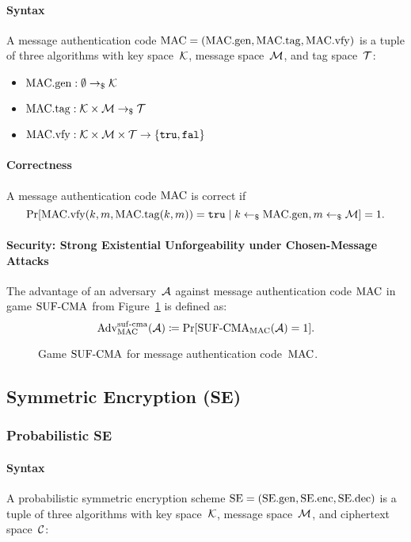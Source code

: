 \documentclass[a4paper,orivec]{llncs}
\begin{document}
\paragraph{Syntax}
A message authentication code $\mathrm{MAC}=(\mathrm{MAC}.\mathrm{gen},\mathrm{MAC}.\mathrm{tag},\mathrm{MAC}.\mathrm{vfy})$ is a tuple of three algorithms with key space~$\mathcal{K}$, message space~$\mathcal{M}$, and tag space~$\mathcal{T}$:

\begin{itemize}
    \item $\mathrm{MAC}.\mathrm{gen}: \emptyset \to_\$ \mathcal{K}$
    \item $\mathrm{MAC}.\mathrm{tag}: \mathcal{K}\times\mathcal{M} \to_\$ \mathcal{T}$
    \item $\mathrm{MAC}.\mathrm{vfy}: \mathcal{K}\times\mathcal{M}\times\mathcal{T} \to \{\mathtt{tru},\mathtt{fal}\}$
\end{itemize}

\paragraph{Correctness}
A message authentication code $\mathrm{MAC}$ is correct if
\[
\Pr[\mathrm{MAC}.\mathrm{vfy}(k,m,\mathrm{MAC}.\mathrm{tag}(k,m))=\mathtt{tru}\mid k\gets_\$\mathrm{MAC}.\mathrm{gen},m\gets_\$\mathcal{M}]=1\text{.}
\]

\paragraph{Security: Strong Existential Unforgeability under Chosen-Message Attacks}
The advantage of an adversary~$\mathcal{A}$ against message authentication code $\mathrm{MAC}$ in game ${\mathrm{SUF}\text{-}\mathrm{CMA}}$ from Figure~\ref{fig:mac:suf} is defined as:
\[
\mathrm{Adv}_{\mathrm{MAC}}^{\mathrm{suf}\text{-}\mathrm{cma}}(\mathcal{A})\coloneqq\Pr[{\mathrm{SUF}\text{-}\mathrm{CMA}}_{\mathrm{MAC}}(\mathcal{A})=1]\text{.}
\]

\begin{figure}[!ht]
    \centering
    \nicoresetlinenr%
    \fbox{%
        \scalebox{\codescalefactor}{%
        }%
    }
    \caption{%
        Game ${\mathrm{SUF}\text{-}\mathrm{CMA}}$ for message authentication code~$\mathrm{MAC}$.
    }
    \label{fig:mac:suf}
\end{figure}


\subsection{Symmetric Encryption (SE)}

\subsubsection{Probabilistic SE}

\paragraph{Syntax}
A probabilistic symmetric encryption scheme $\mathrm{SE}=(\mathrm{SE}.\mathrm{gen},\mathrm{SE}.\mathrm{enc},\mathrm{SE}.\mathrm{dec})$ is a tuple of three algorithms with key space~$\mathcal{K}$, message space~$\mathcal{M}$, and ciphertext space~$\mathcal{C}$:
\end{document}
